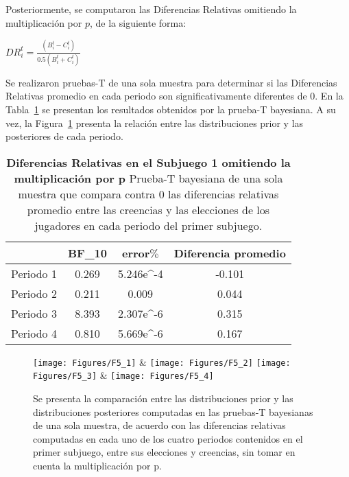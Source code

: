 Posteriormente, se computaron las Diferencias Relativas omitiendo la multiplicación por $p$, de la siguiente forma:\\

\begin{center}
$DR_i^t=  \frac{(B_i^t- C_i^t)}{0.5(B_i^t+ C_i^t)}$
\end{center}

Se realizaron pruebas-T de una sola muestra para determinar si las Diferencias Relativas promedio en cada periodo son significativamente diferentes de 0. En la Tabla~\ref{DRnop-S1-B} se presentan los resultados obtenidos por la prueba-T bayesiana. A su vez, la Figura~\ref{fig:DRnop_S1} presenta la relación entre las distribuciones prior y las posteriores de cada periodo.\\


\begin{table}[h]
\caption[Prueba t de una muestra: Diferencias Relativas en el Subjuego 1 sin la multiplicación por p]{\textbf{Diferencias Relativas en el Subjuego 1 omitiendo la multiplicación por p} Prueba-T bayesiana de una sola muestra que compara contra 0 las diferencias relativas promedio entre las creencias y las elecciones de los jugadores en cada periodo del primer subjuego.}
\label{DRnop-S1-B}
\centering
\begin{tabular}{l | c c | c}
\toprule
\textbf{} & \textbf{BF_10} & \textbf{error$\%$} & \textbf{Diferencia promedio}\\
\midrule
Periodo 1 & 0.269 & 5.246e^-4 & -0.101\\
Periodo 2 & 0.211 & 0.009 & 0.044\\
Periodo 3 & 8.393 & 2.307e^-6 & 0.315\\
Periodo 4 & 0.810 & 5.669e^-6 & 0.167\\
\bottomrule
\end{tabular}
\end{table}
	

\begin{figure}[hp]
\centering
\texttt{[image: Figures/F5\_1]} & \texttt{[image: Figures/F5\_2]} 
\texttt{[image: Figures/F5\_3]} & \texttt{[image: Figures/F5\_4]} 
\decoRule
\caption[Evaluación de las Diferencias Relativas entre creencias y elecciones en el Subjuego 1 sin la multiplicación por p (Factor de Bayes)]{Se presenta la comparación entre las distribuciones prior y las distribuciones posteriores computadas en las pruebas-T bayesianas de una sola muestra, de acuerdo con las diferencias relativas computadas en cada uno de los cuatro periodos contenidos en el primer subjuego, entre sus elecciones y creencias, sin tomar en cuenta la multiplicación por p.}
\label{fig:DRnop_S1}
\end{figure}



